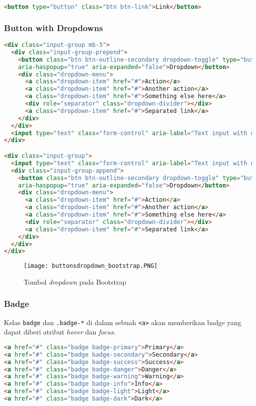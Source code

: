 \begin{itemize}
\begin{lstlisting}[language=HTML, frame=single, basicstyle=\small]
<button type="button" class="btn btn-link">Link</button>
\end{lstlisting}


\subsubsection{Button with Dropdowns}
\begin{lstlisting}[language=HTML, frame=single, basicstyle=\small] 
<div class="input-group mb-3">
  <div class="input-group-prepend">
    <button class="btn btn-outline-secondary dropdown-toggle" type="button" data-toggle="dropdown"
    aria-haspopup="true" aria-expanded="false">Dropdown</button>
    <div class="dropdown-menu">
      <a class="dropdown-item" href="#">Action</a>
      <a class="dropdown-item" href="#">Another action</a>
      <a class="dropdown-item" href="#">Something else here</a>
      <div role="separator" class="dropdown-divider"></div>
      <a class="dropdown-item" href="#">Separated link</a>
    </div>
  </div>
  <input type="text" class="form-control" aria-label="Text input with dropdown button">
</div>

<div class="input-group">
  <input type="text" class="form-control" aria-label="Text input with dropdown button">
  <div class="input-group-append">
    <button class="btn btn-outline-secondary dropdown-toggle" type="button" data-toggle="dropdown"
    aria-haspopup="true" aria-expanded="false">Dropdown</button>
    <div class="dropdown-menu">
      <a class="dropdown-item" href="#">Action</a>
      <a class="dropdown-item" href="#">Another action</a>
      <a class="dropdown-item" href="#">Something else here</a>
      <div role="separator" class="dropdown-divider"></div>
      <a class="dropdown-item" href="#">Separated link</a>
    </div>
  </div>
</div>
\end{lstlisting}

\begin{figure} [H]
	\centering  
	\texttt{[image: buttonsdropdown\_bootstrap.PNG]}  
	\caption{Tombol \textit{dropdown} pada Bootstrap} 
\end{figure}

\subsubsection{Badge}
Kelas \texttt{badge} dan \texttt{.badge-*} di dalam sebuah \texttt{<a>} akan memberikan badge yang dapat diberi atribut \textit{hover} dan \textit{focus}. 
\begin{lstlisting}[language=HTML, frame=single, basicstyle=\small] 
<a href="#" class="badge badge-primary">Primary</a>
<a href="#" class="badge badge-secondary">Secondary</a>
<a href="#" class="badge badge-success">Success</a>
<a href="#" class="badge badge-danger">Danger</a>
<a href="#" class="badge badge-warning">Warning</a>
<a href="#" class="badge badge-info">Info</a>
<a href="#" class="badge badge-light">Light</a>
<a href="#" class="badge badge-dark">Dark</a>
\end{lstlisting}


\end{itemize}
